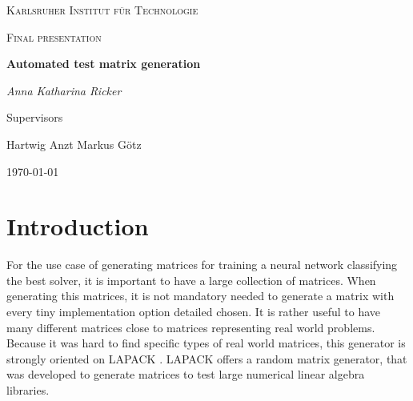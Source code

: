 \documentclass[parskip=full]{scrartcl}
\begin{document}
	
	\begin{titlepage}
		\centering
		{\scshape\LARGE Karlsruher Institut für Technologie\par}
		\vspace{1cm}
		{\scshape\Large Final presentation\par}
		\vspace{1.5cm}
		{\huge\bfseries Automated test matrix generation\par}
		\vspace {2cm}
		
		{\Large\itshape Anna Katharina Ricker\par}
		
		\vfill
		Supervisors\par
		Hartwig Anzt
		Markus G\"{o}tz
		
		\vfill
		{\large\today\par}
	\end{titlepage}
	
	\tableofcontents
	\newpage
	
\section{Introduction}	
For the use case of generating matrices for training a neural network  classifying the best solver, it is important to have a large collection of matrices. When generating this matrices, it is not mandatory needed to generate a matrix with every tiny implementation option detailed chosen. 
It is rather useful to have many different matrices close to matrices representing real world problems. Because it was hard to find specific types of real world matrices, this generator is strongly oriented on LAPACK \cite{LAPACK}. LAPACK offers a random matrix generator, that was developed to generate matrices to test large numerical linear algebra libraries. 
\end{document}
